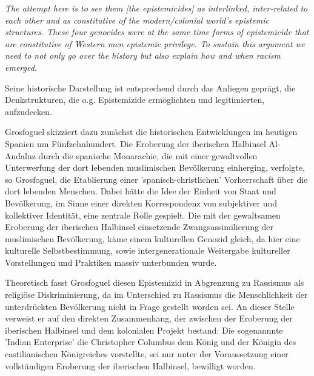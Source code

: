 \begin{myenv}
  \glqq \textit{The attempt here is to see them [the epistemicides] as interlinked,
 inter-related to each other and as constitutive of the modern/colonial world’s
 epistemic structures. These four genocides were at the same time forms of
 epistemicide that are constitutive of Western men epistemic privilege. To
 sustain this argument we need to not only go over the history but also explain
 how and when racism emerged.} \footnotemark {} \grqq 
\end{myenv}

 Seine historische Darstellung ist entsprechend durch das Anliegen geprägt, die
 Denkstrukturen, die o.g. Epistemizide ermöglichten und legitimierten,
 aufzudecken. \footnotemark {}

Grosfoguel skizziert dazu zunächst die historischen Entwicklungen im heutigen
Spanien um Fünfzehnhundert. Die Eroberung der iberischen Halbinsel Al-Andaluz
durch die spanische Monarachie, die mit einer gewaltvollen Unterwerfung der
dort lebenden muslimischen Bevölkerung einherging, verfolgte, so Grosfoguel,
die Etablierung einer 'spanisch-christlichen' Vorherrschaft über die dort
lebenden Menschen. Dabei hätte die Idee der Einheit von Staat und Bevölkerung,
im Sinne einer direkten Korrespondenz von subjektiver und kollektiver
Identität, eine zentrale Rolle gespielt. \footnotemark
{} Die mit
der gewaltsamen Eroberung der iberischen Halbinsel einsetzende
Zwangsassimilierung der muslimischen Bevölkerung, käme einem kulturellen
Genozid gleich, da hier eine kulturelle Selbstbestimmung, sowie
intergenerationale Weitergabe kultureller Vorstellungen und Praktiken massiv
unterbunden wurde. \footnotemark {}

Theoretisch fasst Grosfoguel diesen Epistemizid in Abgrenzung zu Rassismus als
religiöse Diskriminierung, da im Unterschied zu Rassismus die Menschlichkeit
der unterdrückten Bevölkerung nicht in Frage gestellt worden sei.\footnotemark
{} An dieser Stelle verweist er auf den direkten Zusammenhang, der zwischen der Eroberung
der iberischen Halbinsel und dem kolonialen Projekt bestand: Die sogenannnte
'Indian Enterprise' die Christopher Columbus dem König und der Königin des
castilianischen Königreiches vorstellte, sei nur unter der Voraussetzung einer
vollständigen Eroberung der iberischen Halbinsel, bewilligt worden.

